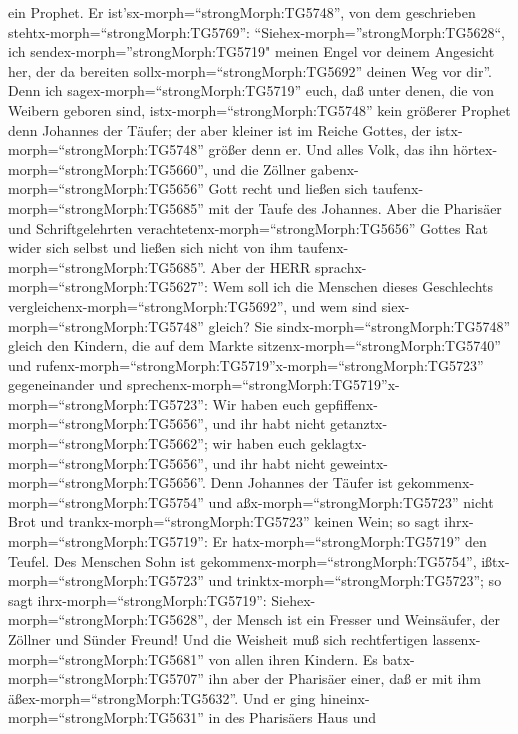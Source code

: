 ein Prophet.  Er ist'sx-morph=``strongMorph:TG5748'', von
dem geschrieben stehtx-morph=``strongMorph:TG5769'':
``Siehex-morph=''strongMorph:TG5628``, ich
sendex-morph=''strongMorph:TG5719" meinen Engel vor deinem Angesicht
her, der da bereiten sollx-morph=``strongMorph:TG5692'' deinen Weg vor
dir''.  Denn ich sagex-morph=``strongMorph:TG5719'' euch,
daß unter denen, die von Weibern geboren sind,
istx-morph=``strongMorph:TG5748'' kein größerer Prophet denn Johannes
der Täufer; der aber kleiner ist im Reiche Gottes, der
istx-morph=``strongMorph:TG5748'' größer denn er.  Und
alles Volk, das ihn hörtex-morph=``strongMorph:TG5660'', und die Zöllner
gabenx-morph=``strongMorph:TG5656'' Gott recht und ließen sich
taufenx-morph=``strongMorph:TG5685'' mit der Taufe des Johannes.
 Aber die Pharisäer und Schriftgelehrten
verachtetenx-morph=``strongMorph:TG5656'' Gottes Rat wider sich selbst
und ließen sich nicht von ihm taufenx-morph=``strongMorph:TG5685''.
 Aber der HERR sprachx-morph=``strongMorph:TG5627'': Wem
soll ich die Menschen dieses Geschlechts
vergleichenx-morph=``strongMorph:TG5692'', und wem sind
siex-morph=``strongMorph:TG5748'' gleich?  Sie
sindx-morph=``strongMorph:TG5748'' gleich den Kindern, die auf dem
Markte sitzenx-morph=``strongMorph:TG5740'' und
rufenx-morph=``strongMorph:TG5719''\textbar x-morph=``strongMorph:TG5723''
gegeneinander und
sprechenx-morph=``strongMorph:TG5719''\textbar x-morph=``strongMorph:TG5723'':
Wir haben euch gepfiffenx-morph=``strongMorph:TG5656'', und ihr habt
nicht getanztx-morph=``strongMorph:TG5662''; wir haben euch
geklagtx-morph=``strongMorph:TG5656'', und ihr habt nicht
geweintx-morph=``strongMorph:TG5656''.  Denn Johannes der
Täufer ist gekommenx-morph=``strongMorph:TG5754'' und
aßx-morph=``strongMorph:TG5723'' nicht Brot und
trankx-morph=``strongMorph:TG5723'' keinen Wein; so sagt
ihrx-morph=``strongMorph:TG5719'': Er hatx-morph=``strongMorph:TG5719''
den Teufel.  Des Menschen Sohn ist
gekommenx-morph=``strongMorph:TG5754'',
ißtx-morph=``strongMorph:TG5723'' und
trinktx-morph=``strongMorph:TG5723''; so sagt
ihrx-morph=``strongMorph:TG5719'': Siehex-morph=``strongMorph:TG5628'',
der Mensch ist ein Fresser und Weinsäufer, der Zöllner und Sünder
Freund!  Und die Weisheit muß sich rechtfertigen
lassenx-morph=``strongMorph:TG5681'' von allen ihren Kindern.
 Es batx-morph=``strongMorph:TG5707'' ihn aber der
Pharisäer einer, daß er mit ihm äßex-morph=``strongMorph:TG5632''. Und
er ging hineinx-morph=``strongMorph:TG5631'' in des Pharisäers Haus und
